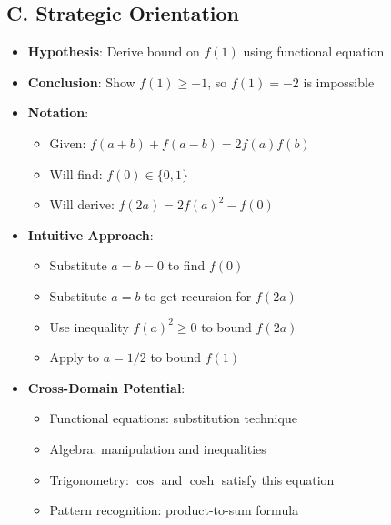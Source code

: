 \documentclass[12pt]{article}
\begin{document}
\begin{problemconfigbox}
\subsection*{C. Strategic Orientation}
\begin{itemize}[leftmargin=*]
    \item \textbf{Hypothesis}: Derive bound on $f(1)$ using functional equation
    \item \textbf{Conclusion}: Show $f(1) \geq -1$, so $f(1) = -2$ is impossible
    \item \textbf{Notation}: 
    \begin{itemize}
        \item Given: $f(a + b) + f(a - b) = 2f(a)f(b)$
        \item Will find: $f(0) \in \{0, 1\}$
        \item Will derive: $f(2a) = 2f(a)^2 - f(0)$
    \end{itemize}
    \item \textbf{Intuitive Approach}: 
    \begin{itemize}
        \item Substitute $a = b = 0$ to find $f(0)$
        \item Substitute $a = b$ to get recursion for $f(2a)$
        \item Use inequality $f(a)^2 \geq 0$ to bound $f(2a)$
        \item Apply to $a = 1/2$ to bound $f(1)$
    \end{itemize}
    \item \textbf{Cross-Domain Potential}: 
    \begin{itemize}
        \item Functional equations: substitution technique
        \item Algebra: manipulation and inequalities
        \item Trigonometry: $\cos$ and $\cosh$ satisfy this equation
        \item Pattern recognition: product-to-sum formula
    \end{itemize}
\end{itemize}
\end{problemconfigbox}
\end{document}
